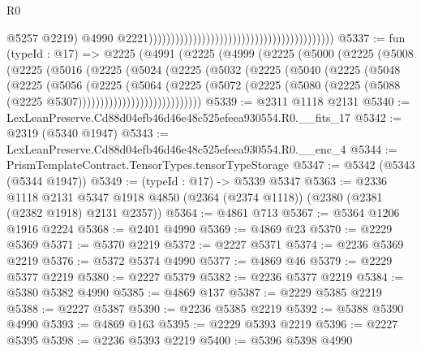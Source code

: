 \begin{lexlean}{R0}
\begin{coremodule}
                                                                                          @5257
                                                                                          @2219)
                                                                                        @4990
                                                                                        @2221))))))))))))))))))))))))))))))))))))))))))
@5337 := fun (typeId : @17) =>
  @2225
    (@4991
      (@2225
        (@4999
          (@2225
            (@5000
              (@2225
                (@5008
                  (@2225
                    (@5016
                      (@2225
                        (@5024
                          (@2225
                            (@5032
                              (@2225
                                (@5040
                                  (@2225
                                    (@5048
                                      (@2225
                                        (@5056
                                          (@2225
                                            (@5064
                                              (@2225
                                                (@5072
                                                  (@2225
                                                    (@5080
                                                      (@2225
                                                        (@5088
                                                          (@2225 @5307))))))))))))))))))))))))))))
@5339 := @2311 @1118 @2131
@5340 := LexLeanPreserve.Cd88d04efb46d46e48c525efeea930554.R0.__fits_17
@5342 := @2319 (@5340 @1947)
@5343 := LexLeanPreserve.Cd88d04efb46d46e48c525efeea930554.R0.__enc_4
@5344 := PrismTemplateContract.TensorTypes.tensorTypeStorage
@5347 := @5342 (@5343 (@5344 @1947))
@5349 := (typeId : @17) -> @5339 @5347
@5363 := @2336
    @1118
    @2131
    @5347
    @1918
    @4850
    (@2364 (@2374 @1118))
    (@2380 (@2381 (@2382 @1918) @2131 @2357))
@5364 := @4861 @713
@5367 := @5364 @1206 @1916 @2224
@5368 := @2401 @4990
@5369 := @4869 @23
@5370 := @2229 @5369
@5371 := @5370 @2219
@5372 := @2227 @5371
@5374 := @2236 @5369 @2219
@5376 := @5372 @5374 @4990
@5377 := @4869 @46
@5379 := @2229 @5377 @2219
@5380 := @2227 @5379
@5382 := @2236 @5377 @2219
@5384 := @5380 @5382 @4990
@5385 := @4869 @137
@5387 := @2229 @5385 @2219
@5388 := @2227 @5387
@5390 := @2236 @5385 @2219
@5392 := @5388 @5390 @4990
@5393 := @4869 @163
@5395 := @2229 @5393 @2219
@5396 := @2227 @5395
@5398 := @2236 @5393 @2219
@5400 := @5396 @5398 @4990

\end{coremodule}
\end{lexlean}
